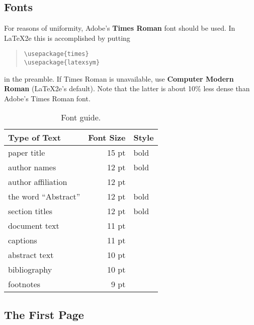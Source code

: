 \documentclass[11pt]{article}
\begin{document}

\subsection{Fonts}

For reasons of uniformity, Adobe's {\bf Times Roman} font should be
used. In \LaTeX2e{} this is accomplished by putting

\begin{quote}
\begin{verbatim}
\usepackage{times}
\usepackage{latexsym}
\end{verbatim}
\end{quote}
in the preamble. If Times Roman is unavailable, use {\bf Computer
  Modern Roman} (\LaTeX2e{}'s default).  Note that the latter is about
  10\% less dense than Adobe's Times Roman font.


\begin{table}[h]
\begin{center}
\begin{tabular}{|l|rl|}
\hline \bf Type of Text & \bf Font Size & \bf Style \\ \hline
paper title & 15 pt & bold \\
author names & 12 pt & bold \\
author affiliation & 12 pt & \\
the word ``Abstract'' & 12 pt & bold \\
section titles & 12 pt & bold \\
document text & 11 pt  &\\
captions & 11 pt & \\
abstract text & 10 pt & \\
bibliography & 10 pt & \\
footnotes & 9 pt & \\
\hline
\end{tabular}
\end{center}
\caption{\label{font-table} Font guide. }
\end{table}

\subsection{The First Page}
\label{ssec:first}
\end{document}
